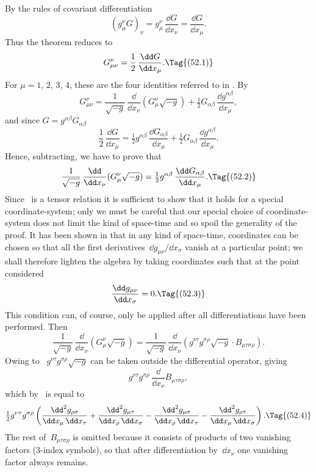 \documentclass[12pt]{book}
\begin{document}
By the rules of covariant differentiation
\[
(g_{\mu}^{\nu} G)_{\nu} = g_{\mu}^{\nu}\, \frac{\dd G}{\dd x_{\nu}} = \frac{\dd G}{\dd x_{\mu}}.
\]
Thus the theorem reduces to
\[
G_{\mu\nu}^{\nu} = \frac{1}{2}\, \frac{\dd G}{\dd x_{\mu}}.
\Tag{(52.1)}
\]
For $\mu = 1$, $2$, $3$, $4$, these are the four identities referred to in . By~
\[
G_{\mu\nu}^{\nu}
= \frac{1}{\sqrt{-g}}\, \frac{\dd}{\dd x_{\nu}} (G_{\mu}^{\nu} \sqrt{-g})
+ \tfrac{1}{2} G_{\alpha\beta}\, \frac{\dd g^{\alpha\beta}}{\dd x_{\mu}},
\]
and since $G = g^{\alpha\beta} G_{\alpha\beta}$
\[
\frac{1}{2}\, \frac{\dd G}{\dd x_{\mu}}
= \tfrac{1}{2} g^{\alpha\beta}\, \frac{\dd G_{\alpha\beta}}{\dd x_{\mu}}
+ \tfrac{1}{2} G_{\alpha\beta}\, \frac{\dd g^{\alpha\beta}}{\dd x_{\mu}}.
\]
Hence, subtracting, we have to prove that
\[
\frac{1}{\sqrt{-g}}\, \frac{\dd}{\dd x_{\nu}} (G_{\mu}^{\nu} \sqrt{-g})
= \tfrac{1}{2} g^{\alpha\beta}\, \frac{\dd G_{\alpha\beta}}{\dd x_{\mu}}.
\Tag{(52.2)}
\]
Since ~is a tensor relation it is sufficient to show that it holds for a special
coordinate\hyp{}system; only we must be careful that our special choice of coordinate\hyp{}system
does not limit the kind of space-time and so spoil the generality
of the proof. It has been shown in  that in any kind of space-time, coordinates
can be chosen so that all the first derivatives~$\dd g_{\mu\nu}/\dd x_{\sigma}$ vanish at a
particular point; we shall therefore lighten the algebra by taking coordinates
such that at the point considered
\[
\frac{\dd g_{\mu\nu}}{\dd x_{\sigma}} = 0.
\Tag{(52.3)}
\]
This condition can, of course, only be applied after all differentiations have
been performed. Then
\[
\frac{1}{\sqrt{-g}}\, \frac{\dd}{\dd x_{\nu}} (G_{\mu}^{\nu} \sqrt{-g})
= \frac{1}{\sqrt{-g}}\, \frac{\dd}{\dd x_{\nu}} (g^{\nu\tau} g^{\sigma\rho} \sqrt{-g}\cdot B_{\mu\tau\sigma\rho}).
\]
Owing to~ $g^{\nu\tau} g^{\sigma\rho} \sqrt{-g}$ can be taken outside the differential operator,
giving
\[
g^{\nu\tau} g^{\sigma\rho}\, \frac{\dd}{\dd x_{\nu}} B_{\mu\tau\sigma\rho},
\]
which by~ is equal to
\[
\tfrac{1}{2} g^{\nu\tau} g^{\sigma\rho} \left(
  \frac{\dd^{2} g_{\rho\sigma}}{\dd x_{\mu}\, \dd x_{\tau}}
  + \frac{\dd^{2} g_{\mu\tau}}{\dd x_{\rho}\, \dd x_{\sigma}}
  - \frac{\dd^{2} g_{\mu\sigma}}{\dd x_{\rho}\, \dd x_{\tau}}
  - \frac{\dd^{2} g_{\rho\tau}}{\dd x_{\mu}\, \dd x_{\sigma}}\right).
\Tag{(52.4)}
\]
The rest of~$B_{\mu\tau\sigma\rho}$ is omitted because it consists of products of two vanishing
factors ($3$-index symbols), so that after differentiation by~$\dd x_{\nu}$ one vanishing
factor always remains.
\end{document}
